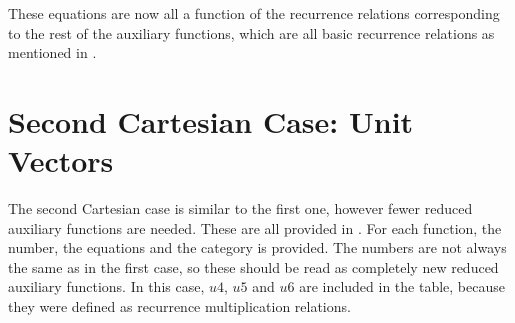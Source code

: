 \noindent
These equations are now all a function of the recurrence relations corresponding to the rest of the auxiliary functions, which are all basic recurrence relations as mentioned in . \\



\section{Second Cartesian Case: Unit Vectors}
\label{sec:secCartApp}
The second Cartesian case is similar to the first one, however fewer reduced auxiliary functions are needed. These are all provided in . For each function, the number, the equations and the category is provided. The numbers are not always the same as in the first case, so these should be read as completely new reduced auxiliary functions. In this case, $u4$, $u5$ and $u6$ are included in the table, because they were defined as recurrence multiplication relations.


